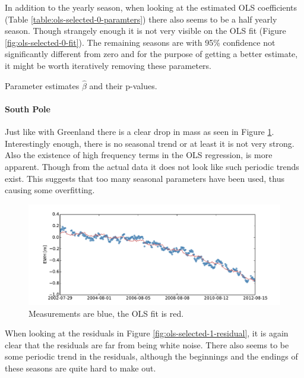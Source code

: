 In addition to the yearly season, when looking at the estimated OLS coefficients (Table \ref{table:ols-selected-0-paramters}) there also seems to be a half yearly season. Though strangely enough it is not very visible on the OLS fit (Figure \ref{fig:ols-selected-0-fit}). The remaining seasons are with 95\% confidence not significantly different from zero and for the purpose of getting a better estimate, it might be worth iteratively removing these parameters.
\begin{table}[H]
\centering
\centerline{}
\caption{Parameter estimates $\hat{\beta}$ and their p-values. }
\label{table:ols-selected-0-paramters}
\end{table}

\paragraph{South Pole}

Just like with Greenland there is a clear drop in mass as seen in Figure \ref{fig:ols-selected-1-fit}. Interestingly enough, there is no seasonal trend or at least it is not very strong. Also the existence of high frequency terms in the OLS regression, is more apparent. Though from the actual data it does not look like such periodic trends exist. This suggests that too many seasonal parameters have been used, thus causing some overfitting.
\begin{figure}[H]
	\centering
	\includegraphics[width=\textwidth]{figures/ols-selected-1-fit}
	\caption{Measurements are blue, the OLS fit is red.}
	\label{fig:ols-selected-1-fit}
\end{figure}

When looking at the residuals in Figure \ref{fig:ols-selected-1-residual}, it is again clear that the residuals are far from being white noise. There also seems to be some periodic trend in the residuals, although the beginnings and the endings of these seasons are quite hard to make out. 

